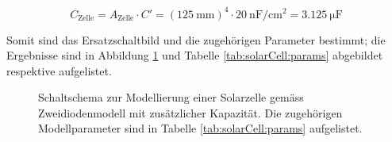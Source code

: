 \begin{equation}
    \label{eq:capa:jac}
    C_{\mathrm{Zelle}}
    = A_{\mathrm{Zelle}} \cdot C'
    = \left( \SI{125}{\milli\meter} \right)^4 \cdot \SI{20}{\nano\farad\per\centi\meter\squared}
    = \SI{3.125}{\micro\farad}
\end{equation}

Somit  sind das  Ersatzschaltbild  und die  zugeh\"origen Parameter  bestimmt;
die  Ergebnisse  sind  in Abbildung  \ref{fig:circuit:solarCell}  und  Tabelle
\ref{tab:solarCell:params} abgebildet respektive aufgelistet.

\begin{figure}[h!tb]
    \centering
    
    \caption{%
        Schaltschema    zur    Modellierung    einer    Solarzelle    gem\"ass
        Zweidiodenmodell  mit  zus\"atzlicher  Kapazit\"at. Die  zugeh\"origen
        Modellparameter    sind    in    Tabelle    \ref{tab:solarCell:params}
        aufgelistet.%
    }
    \label{fig:circuit:solarCell}
\end{figure}


